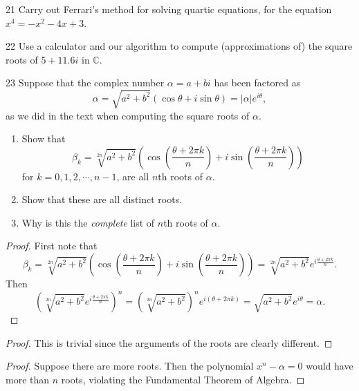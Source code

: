 \begin{problem}{21}
    Carry out Ferrari's method for solving quartic equations, for the equation
    $x^4 = -x^2 - 4x + 3$.
\end{problem}
\unsolved

\begin{problem}{22}
    Use a calculator and our algorithm to compute (approximations of) the square roots of
    $5 + 11.6i$ in $\mathbb{C}$.
\end{problem}
\unsolved

\begin{problem}{23}
    Suppose that the complex number $\alpha = a + bi$ has been factored as 
    \[\alpha = \sqrt{a^2 + b^2}(\cos \theta + i \sin \theta) = |\alpha| e^{i \theta},\]
    as we did in the text when computing the square roots of $\alpha$.
    \begin{enumerate}
        \item Show that 
        \[\beta_k = \sqrt[2n]{a^2 + b^2}\left(\cos\left(\frac{\theta + 2 \pi k}{n}\right) + i \sin \left(\frac{\theta + 2 \pi k}{n}\right)\right)\]
        for $k = 0, 1, 2, \cdots, n - 1$, are all $n$th roots of $\alpha$.
        \item Show that these are all distinct roots.
        \item Why is this the \emph{complete} list of $n$th roots of $\alpha$.
    \end{enumerate}
\end{problem}
\solved

\begin{proof}
    First note that 
    \[\beta_k 
        =  \sqrt[2n]{a^2 + b^2}\left(\cos\left(\frac{\theta + 2 \pi k}{n}\right) + i \sin \left(\frac{\theta + 2 \pi k}{n}\right)\right) 
        = \sqrt[2n]{a^2 + b^2}e^{i\frac{\theta + 2 \pi k}{n}}.\]
    Then 
    \[\left(\sqrt[2n]{a^2 + b^2}e^{i\frac{\theta + 2 \pi k}{n}}\right)^n 
        = \left(\sqrt[2n]{a^2 + b^2}\right)^n e^{i(\theta + 2\pi k)}
        = \sqrt{a^2 + b^2}e^{i\theta}
        = \alpha.\]
\end{proof}

\begin{proof}
    This is trivial since the arguments of the roots are clearly different.
\end{proof}

\begin{proof}
    Suppose there are more roots.
    Then the polynomial $x^n - \alpha = 0$ would have more than $n$ roots,
    violating the Fundamental Theorem of Algebra.
\end{proof}

